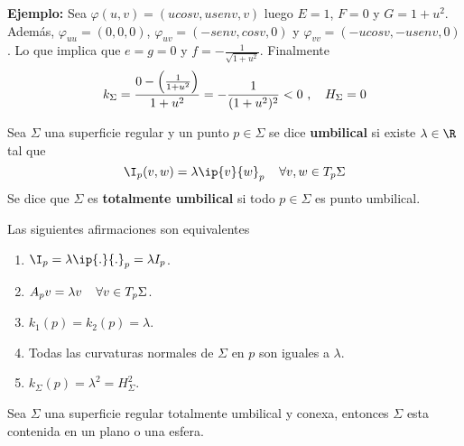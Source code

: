 \documentclass{article}
\begin{document}
\noindent\textbf{Ejemplo:} Sea $\varphi(u,v)=(ucosv,usenv,v)$ luego $E=1$, $F=0$ y $G=1+u^{2}$.
Además, $\varphi_{uu}=(0,0,0)$, $\varphi_{uv}=(-senv,cosv,0)$ y $\varphi_{vv}=(-ucosv,-usenv,0)$.
Lo que implica que $e=g=0$ y $f=-\frac{1}{\sqrt{1+u^{2}}}$. Finalmente
\begin{equation*}
    k_{\Sigma}=\frac{0-\left(\frac{1}{1+u^{2}}\right)}{1+u^{2}}=-\frac{1}{(1+u^{2})^{2}}<0
    \text{ ,}\hspace{4mm}H_{\Sigma}=0
\end{equation*}
\begin{dfn}
    Sea $\Sigma$ una superficie regular y un punto $p\in\Sigma$ se dice \textbf{umbilical} si 
    existe $\lambda\in\R$ tal que
    \begin{equation*}
        \I_{p}(v,w)=\lambda\ip{v}{w}_{p}\hspace{4mm}\forall v,w\in T_{p}\Sigma
    \end{equation*}
    Se dice que $\Sigma$ es \textbf{totalmente umbilical} si todo $p\in\Sigma$ es punto umbilical.
\end{dfn}
\begin{prop}
    Las siguientes afirmaciones son equivalentes
    \begin{enumerate}
        \item $\I_{p}=\lambda\ip{.}{.}_{p}=\lambda I_{p}$.
        \item $A_{p}v=\lambda v\hspace{4mm}\forall v\in T_{p}\Sigma$.
        \item $k_{1}(p)=k_{2}(p)=\lambda$.
        \item Todas las curvaturas normales de $\Sigma$ en $p$ son iguales a $\lambda$.
        \item $k_{\Sigma}(p)=\lambda^{2}=H_{\Sigma}^{2}$.
    \end{enumerate}
\end{prop}
\begin{teo}
    Sea $\Sigma$ una superficie regular totalmente umbilical y conexa, entonces $\Sigma$ esta 
    contenida en un plano o una esfera.
\end{teo}
\end{document}
